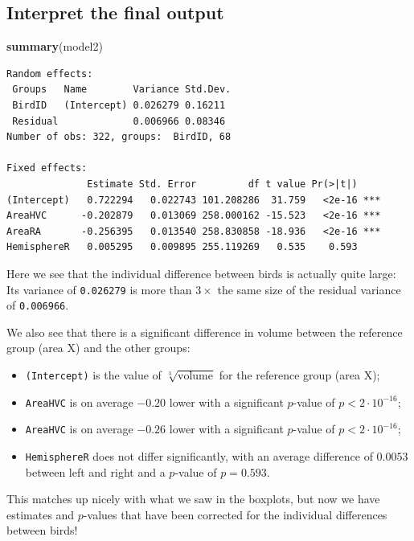 \documentclass[
]{book}
\newenvironment{Shaded}{\begin{snugshade}}{\end{snugshade}}
\newcommand{\KeywordTok}[1]{\textcolor[rgb]{0.13,0.29,0.53}{\textbf{#1}}}
\newcommand{\NormalTok}[1]{#1}
\providecommand{\tightlist}{%
  \setlength{\itemsep}{0pt}\setlength{\parskip}{0pt}}
\begin{document}
\hypertarget{brainoutput}{%
\subsection{Interpret the final output}\label{brainoutput}}

\begin{Shaded}
\begin{Highlighting}[]
\KeywordTok{summary}\NormalTok{(model2)}
\end{Highlighting}
\end{Shaded}

\begin{verbatim}
Random effects:
 Groups   Name        Variance Std.Dev.
 BirdID   (Intercept) 0.026279 0.16211 
 Residual             0.006966 0.08346 
Number of obs: 322, groups:  BirdID, 68

Fixed effects:
              Estimate Std. Error         df t value Pr(>|t|)    
(Intercept)   0.722294   0.022743 101.208286  31.759   <2e-16 ***
AreaHVC      -0.202879   0.013069 258.000162 -15.523   <2e-16 ***
AreaRA       -0.256395   0.013540 258.830858 -18.936   <2e-16 ***
HemisphereR   0.005295   0.009895 255.119269   0.535    0.593    
\end{verbatim}

Here we see that the individual difference between birds is actually quite large: Its variance of \texttt{0.026279} is more than \(3\times\) the same size of the residual variance of \texttt{0.006966}.

We also see that there is a significant difference in volume between the reference group (area X) and the other groups:

\begin{itemize}
\tightlist
\item
  \texttt{(Intercept)} is the value of \(\sqrt[3]{\text{volume}}\) for the reference group (area X);
\item
  \texttt{AreaHVC} is on average \(-0.20\) lower with a significant \(p\)-value of \(p < 2 \cdot 10^{-16}\);
\item
  \texttt{AreaHVC} is on average \(-0.26\) lower with a significant \(p\)-value of \(p < 2 \cdot 10^{-16}\);
\item
  \texttt{HemisphereR} does not differ significantly, with an average difference of \(0.0053\) between left and right and a \(p\)-value of \(p = 0.593\).
\end{itemize}

This matches up nicely with what we saw in the boxplots, but now we have estimates and \(p\)-values that have been corrected for the individual differences between birds!
\end{document}
